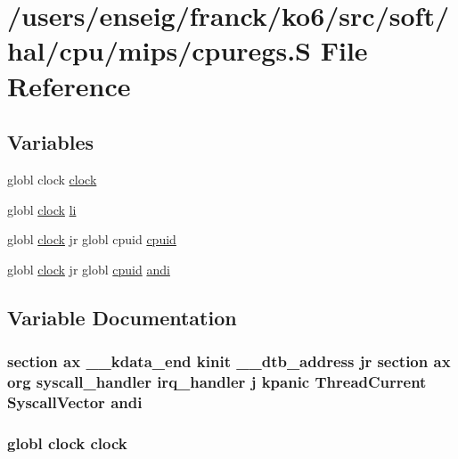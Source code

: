 \hypertarget{mips_2cpuregs_8S}{\section{/users/enseig/franck/ko6/src/soft/hal/cpu/mips/cpuregs.S File Reference}
\label{mips_2cpuregs_8S}
}
\subsection*{Variables}
\begin{DoxyCompactItemize}
\item 
globl clock \hyperlink{mips_2cpuregs_8S_af7e0f9f0eada9d28b46b4d1f7ae5b702}{clock}
\item 
globl \hyperlink{libc_8h_a6f8d66e44afa86c6e39901b0dbbf709e}{clock} \hyperlink{mips_2cpuregs_8S_ace4a8178e9cd55f1d8c8184a3945ef71}{li}
\item 
globl \hyperlink{libc_8h_a6f8d66e44afa86c6e39901b0dbbf709e}{clock} jr globl cpuid \hyperlink{mips_2cpuregs_8S_a78a056c2e0d1097b3c4d7e569b8cdc0a}{cpuid}
\item 
globl \hyperlink{libc_8h_a6f8d66e44afa86c6e39901b0dbbf709e}{clock} jr globl \hyperlink{cpuregs_8h_a5c7c978ab352f02680b961d2b9f5a9c5}{cpuid} \hyperlink{mips_2cpuregs_8S_a1d8aee1caeac6c96721f7c6296321af9}{andi}
\end{DoxyCompactItemize}


\subsection{Variable Documentation}
\hypertarget{mips_2cpuregs_8S_a1d8aee1caeac6c96721f7c6296321af9}{
\subsubsection[{andi}]{\setlength{\rightskip}{0pt plus 5cm}section ax {\bf \-\_\-\-\_\-kdata\-\_\-end} {\bf kinit} \-\_\-\-\_\-dtb\-\_\-address jr section ax org {\bf syscall\-\_\-handler} {\bf irq\-\_\-handler} j {\bf kpanic} {\bf Thread\-Current} {\bf Syscall\-Vector} andi}}\label{mips_2cpuregs_8S_a1d8aee1caeac6c96721f7c6296321af9}
\hypertarget{mips_2cpuregs_8S_af7e0f9f0eada9d28b46b4d1f7ae5b702}{
\subsubsection[{clock}]{\setlength{\rightskip}{0pt plus 5cm}globl clock clock}}\label{mips_2cpuregs_8S_af7e0f9f0eada9d28b46b4d1f7ae5b702}


